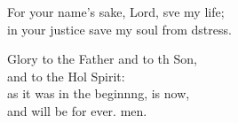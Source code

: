 \begin{psalmverse}
\begin{patverse}
    For your name’s sake, Lord, sve my life;\Med\\
    in your justice save my soul from d\pointup{\i}stress.

    Glory to the Father and to th Son,\Med\\
    and to the Hol Spirit:\\
    as it was in the beginn\pointup{\i}ng, is now,\Med\\
    and will be for ever. men.
  \end{patverse}
  \end{psalmverse}
